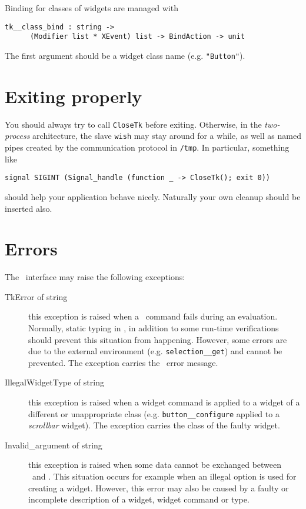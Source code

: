 Binding for classes of widgets are managed with
\begin{verbatim}
tk__class_bind : string -> 
      (Modifier list * XEvent) list -> BindAction -> unit
\end{verbatim} 
The first argument should be a widget class name (e.g. \verb|"Button"|).

\section{Exiting properly}
You should always try to call \verb|CloseTk| before exiting. Otherwise, in
the {\em two-process} architecture, the slave {\tt wish} may stay around for
a while, as well as named pipes created by the communication protocol in
\verb|/tmp|. In particular, something like  
\begin{verbatim}
signal SIGINT (Signal_handle (function _ -> CloseTk(); exit 0))
\end{verbatim} 
should help your application behave nicely. Naturally your own cleanup
should be inserted also.

\section{Errors}
The \camltk\ interface may raise the following exceptions:
\begin{description}
\item[TkError of string] this exception is raised when a \tcl\tk\ command fails
during an evaluation. Normally, static typing in \caml, in addition to some
run-time verifications should prevent this situation from happening.
However, some errors are due to the external environment (e.g.
\verb|selection__get|) and cannot be prevented. The exception carries the
\tcl\tk\ error message.

\item[IllegalWidgetType of string]
this exception is raised when a widget command is applied to a widget of a
different or unappropriate class (e.g. \verb|button__configure| applied to
a {\em scrollbar} widget). The exception carries the class of the faulty
widget.

\item[Invalid\_argument of string]
this exception is raised  when some data cannot be exchanged between \caml\
and \tk. This situation occurs for example when an illegal option is used
for creating a widget. However, this error may also be caused by a faulty or
incomplete description of a widget, widget command or type.
\end{description} 

